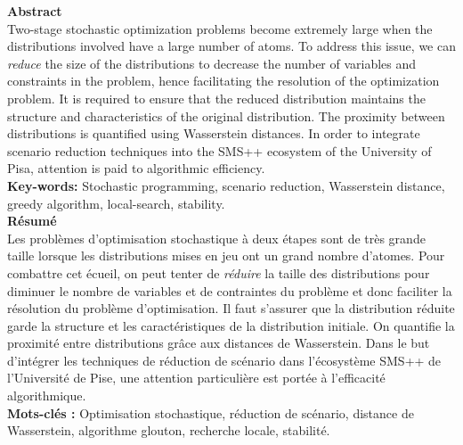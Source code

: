 \documentclass{amsart}
\begin{document}
\begin{titlepage}

    \vspace*{1cm}
        \Large\textbf{Abstract} \\
    
    \normalsize Two-stage stochastic optimization problems become extremely large when the distributions involved have a large number of atoms. To address this issue, we can \emph{reduce} the size of the distributions to decrease the number of variables and constraints in the problem, hence facilitating the resolution of the optimization problem. It is required to ensure that the reduced distribution maintains the structure and characteristics of the original distribution. The proximity between distributions is quantified using Wasserstein distances. In order to integrate scenario reduction techniques into the SMS++ ecosystem of the University of Pisa, attention is paid to algorithmic efficiency. \\

    
    \textbf{Key-words:} Stochastic programming, scenario reduction, Wasserstein distance, greedy algorithm, local-search, stability.
  \\

        \vspace*{1cm}
        \Large\textbf{Résumé} \\
    
    \normalsize Les problèmes d'optimisation stochastique à deux étapes sont de très grande taille lorsque les distributions mises en jeu ont un grand nombre d'atomes. Pour combattre cet écueil, on peut tenter de \emph{réduire} la taille des distributions pour diminuer le nombre de variables et de contraintes du problème et donc faciliter la résolution du problème d'optimisation. Il faut s'assurer que la distribution réduite garde la structure et les caractéristiques de la distribution initiale. On quantifie la proximité entre distributions grâce aux distances de Wasserstein. Dans le but d'intégrer les techniques de réduction de scénario dans l'écosystème SMS++ de l'Université de Pise, une attention particulière est portée à l'efficacité algorithmique.  \\
    
    \textbf{Mots-clés :} Optimisation stochastique, réduction de scénario, distance de Wasserstein, algorithme glouton, recherche locale, stabilité.
    
\end{titlepage}
\end{document}

